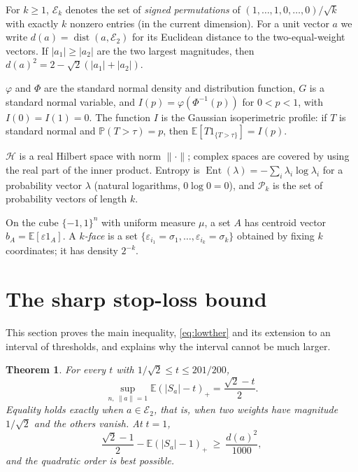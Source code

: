\documentclass[11pt,a4paper]{article}
\numberwithin{equation}{section}
\newtheorem{theorem}{Theorem}[section]
\theoremstyle{remark}
\newcommand{\E}{\mathbb E}
\newcommand{\PP}{\mathbb P}
\newcommand{\cH}{\mathcal H}
\newcommand{\dist}{\operatorname{dist}}
\newcommand{\Ent}{\operatorname{Ent}}
\begin{document}
For $k\ge1$, $\mathcal E_k$ denotes the set of \emph{signed permutations} of
$(1,\ldots,1,0,\ldots,0)/\sqrt k$ with exactly $k$ nonzero entries (in the
current dimension). For a unit vector $a$ we write
$d(a)=\dist(a,\mathcal E_2)$ for its Euclidean distance to the
two-equal-weight vectors. If $|a_1|\ge|a_2|$ are the two largest
magnitudes, then $d(a)^2=2-\sqrt2(|a_1|+|a_2|)$.

$\varphi$ and $\Phi$ are the standard normal density and distribution
function, $G$ is a standard normal variable, and
$I(p)=\varphi(\Phi^{-1}(p))$ for $0<p<1$, with $I(0)=I(1)=0$. The function
$I$ is the Gaussian isoperimetric profile: if $T$ is standard normal and
$\PP(T>\tau)=p$, then $\E[T1_{\{T>\tau\}}]=I(p)$.

$\cH$ is a real Hilbert space with norm $\|\cdot\|$; complex spaces are
covered by using the real part of the inner product. Entropy is
$\Ent(\lambda)=-\sum_i\lambda_i\log\lambda_i$ for a probability vector
$\lambda$ (natural logarithms, $0\log0=0$), and $\mathcal P_k$ is the set of
probability vectors of length $k$.

On the cube $\{-1,1\}^n$ with uniform measure $\mu$, a set $A$ has
centroid vector $b_A=\E[\varepsilon1_A]$. A \emph{$k$-face} is a set
$\{\varepsilon_{i_1}=\sigma_1,\ldots,\varepsilon_{i_k}=\sigma_k\}$ obtained by
fixing $k$ coordinates; it has density $2^{-k}$.

\section{The sharp stop-loss bound}\label{sec:excess}

This section proves the main inequality, \eqref{eq:lowther} and its
extension to an interval of thresholds, and explains why the interval cannot
be much larger.

\begin{theorem}\label{thm:stoploss}
For every $t$ with $1/\sqrt2\le t\le 201/200$,
\[
 \sup_{n,\ \|a\|=1}\E(|S_a|-t)_+=\frac{\sqrt2-t}{2}.
\]
Equality holds exactly when $a\in\mathcal E_2$, that is, when two weights
have magnitude $1/\sqrt2$ and the others vanish. At $t=1$,
\begin{equation}\label{eq:stab1}
 \frac{\sqrt2-1}{2}-\E(|S_a|-1)_+\ \ge\ \frac{d(a)^2}{1000},
\end{equation}
and the quadratic order is best possible.
\end{theorem}
\end{document}
